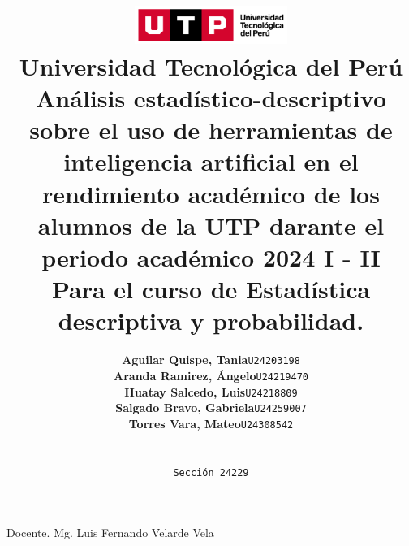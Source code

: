 \documentclass{article}
\title{
  \pagenumbering{gobble}
  \includegraphics[width=5cm]{./assets/logo-utp.png} \\
  \vspace{1cm}
  \textbf{Universidad Tecnológica del Perú} \\
  \vspace{2cm}
  \textbf{Análisis estadístico-descriptivo sobre el uso de herramientas de inteligencia artificial en el rendimiento académico de los alumnos de la UTP darante el periodo académico 2024 I - II} \\
  \vspace{1cm}
  \large \textbf{Para el curso de Estadística descriptiva y probabilidad.}
}
\author{
  \begin{tabular}{ll}
    \textbf{Aguilar Quispe, Tania} & \texttt{U24203198} \\
    \textbf{Aranda Ramirez, Ángelo} & \texttt{U24219470} \\
    \textbf{Huatay Salcedo, Luis} & \texttt{U24218809} \\
    \textbf{Salgado Bravo, Gabriela} & \texttt{U24259007} \\
    \textbf{Torres Vara, Mateo} & \texttt{U24308542} \\
  \end{tabular} \\\\
  \texttt{Sección 24229}
}
\begin{document}
\maketitle
\begin{center}

  Docente. Mg. Luis Fernando Velarde Vela

\end{center}

%
%

\newpage

\setcounter{page}{2}  

\tableofcontents
\thispagestyle{fancy}




















\end{document}
